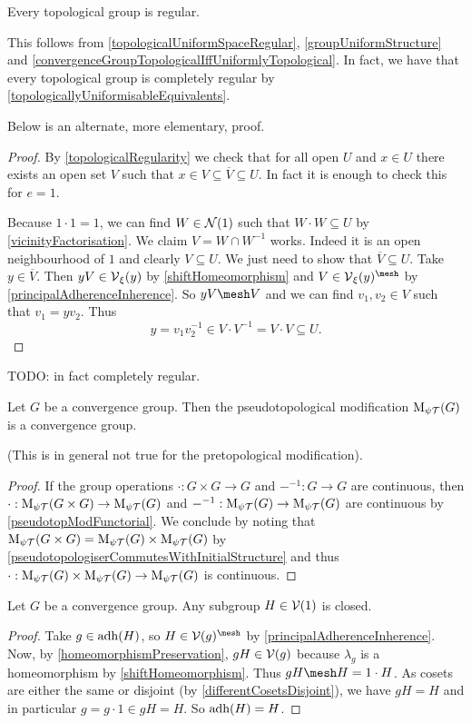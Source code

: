 \begin{proposition} \label{topologicalGroupsRegular}
Every topological group is regular.
\end{proposition}
This follows from \ref{topologicalUniformSpaceRegular}, \ref{groupUniformStructure} and \ref{convergenceGroupTopologicalIffUniformlyTopological}.
In fact, we have that every topological group is completely regular by \ref{topologicallyUniformisableEquivalents}.

Below is an alternate, more elementary, proof.
\begin{proof}
By \ref{topologicalRegularity} we check that for all open $U$ and $x\in U$ there exists an open set $V$ such that $x\in V\subseteq \overline{V}\subseteq U$. In fact it is enough to check this for $e = 1$.\

Because $1\cdot 1 = 1$, we can find $W\in\operatorname{\mathcal{N}}(1)$ such that $W\cdot W \subseteq U$ by \ref{vicinityFactorisation}. We claim $V= W\cap W^{-1}$ works. Indeed it is an open neighbourhood of $1$ and clearly $V\subseteq U$. We just need to show that $\overline{V}\subseteq U$. Take $y\in \overline{V}$. Then $yV\in \operatorname{\mathcal{V}}_\xi(y)$ by \ref{shiftHomeomorphism} and $V\in \vicinity_\xi(y)^{\mesh}$ by \ref{principalAdherenceInherence}. So $yV\mesh V$ and we can find $v_1,v_2\in V$ such that $v_1 = yv_2$. Thus
\[ y = v_1v_2^{-1} \in V\cdot V^{-1} = V\cdot V \subseteq U. \]
\end{proof}
TODO: in fact completely regular.

\begin{proposition}
Let $G$ be a convergence group. Then the pseudotopological modification $\operatorname{M_{\psi\mathcal{T}}}(G)$ is a convergence
group.
\end{proposition}
(This is in general not true for the pretopological modification).
\begin{proof}
If the group operations $\cdot: G\times G\to G$ and $-^{-1}: G\to G$ are continuous, then $\cdot: \operatorname{M_{\psi\mathcal{T}}}(G\times G)\to \operatorname{M_{\psi\mathcal{T}}}(G)$ and $-^{-1}: \operatorname{M_{\psi\mathcal{T}}}(G)\to \operatorname{M_{\psi\mathcal{T}}}(G)$ are continuous by \ref{pseudotopModFunctorial}. We conclude by noting that $\operatorname{M_{\psi\mathcal{T}}}(G\times G) = \operatorname{M_{\psi\mathcal{T}}}(G)\times \operatorname{M_{\psi\mathcal{T}}}(G)$ by \ref{pseudotopologiserCommutesWithInitialStructure} and thus $\cdot: \operatorname{M_{\psi\mathcal{T}}}(G)\times \operatorname{M_{\psi\mathcal{T}}}(G)\to \operatorname{M_{\psi\mathcal{T}}}(G)$ is continuous.
\end{proof}

\begin{proposition}
Let $G$ be a convergence group. Any subgroup $H\in\operatorname{\mathcal{V}}(1)$ is closed.
\end{proposition}
\begin{proof}
Take $g\in \operatorname{adh}(H)$, so $H\in \vicinity(g)^{\mesh}$ by \ref{principalAdherenceInherence}. Now, by \ref{homeomorphismPreservation}, $gH\in \operatorname{\mathcal{V}}(g)$ because $\lambda_g$ is a homeomorphism by \ref{shiftHomeomorphism}. Thus $gH \mesh H = 1\cdot H$. As cosets are either the same or disjoint (by \ref{differentCosetsDisjoint}), we have $gH = H$ and in particular $g = g\cdot 1 \in gH = H$. So $\operatorname{adh}(H) = H$.
\end{proof}

